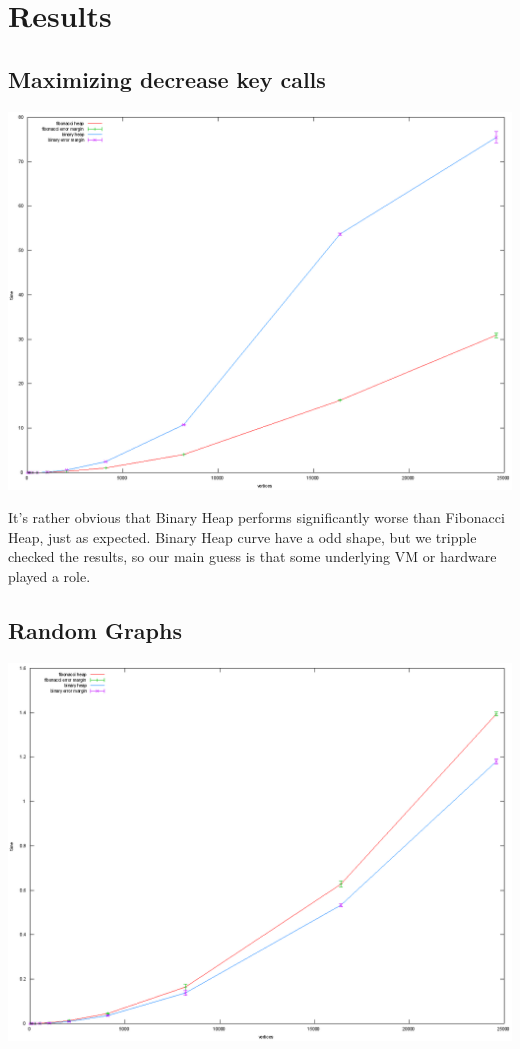 \section*{Results}
\subsection*{Maximizing decrease key calls}
\includegraphics[scale=0.30]{../results/fibonacci-binary-dkmax2.png}
 
It's rather obvious that Binary Heap performs significantly worse than Fibonacci Heap, just as expected. Binary Heap curve have a odd shape, but we tripple checked the results, so our main guess is that some underlying VM or hardware played a role.
\subsection*{Random Graphs}
\includegraphics[scale=0.30]{../results/fibonacci-binary-random.png}

